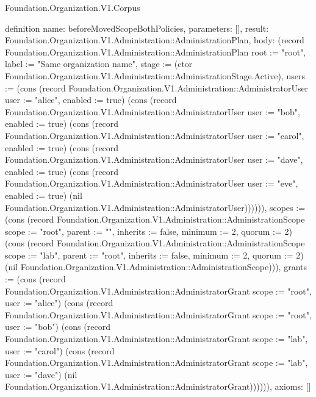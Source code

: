 \begin{lexlean}{Foundation.Organization.V1.Corpus}
\begin{semanticmodule}
definition{
  name: beforeMovedScopeBothPolicies,
  parameters: [],
  result: Foundation.Organization.V1.Administration::AdministrationPlan,
  body: (record Foundation.Organization.V1.Administration::AdministrationPlan {root := "root", label := "Same organization name", stage := (ctor Foundation.Organization.V1.Administration::AdministrationStage.Active), users := (cons (record Foundation.Organization.V1.Administration::AdministratorUser {user := "alice", enabled := true}) (cons (record Foundation.Organization.V1.Administration::AdministratorUser {user := "bob", enabled := true}) (cons (record Foundation.Organization.V1.Administration::AdministratorUser {user := "carol", enabled := true}) (cons (record Foundation.Organization.V1.Administration::AdministratorUser {user := "dave", enabled := true}) (cons (record Foundation.Organization.V1.Administration::AdministratorUser {user := "eve", enabled := true}) (nil Foundation.Organization.V1.Administration::AdministratorUser)))))), scopes := (cons (record Foundation.Organization.V1.Administration::AdministrationScope {scope := "root", parent := "", inherits := false, minimum := 2, quorum := 2}) (cons (record Foundation.Organization.V1.Administration::AdministrationScope {scope := "lab", parent := "root", inherits := false, minimum := 2, quorum := 2}) (nil Foundation.Organization.V1.Administration::AdministrationScope))), grants := (cons (record Foundation.Organization.V1.Administration::AdministratorGrant {scope := "root", user := "alice"}) (cons (record Foundation.Organization.V1.Administration::AdministratorGrant {scope := "root", user := "bob"}) (cons (record Foundation.Organization.V1.Administration::AdministratorGrant {scope := "lab", user := "carol"}) (cons (record Foundation.Organization.V1.Administration::AdministratorGrant {scope := "lab", user := "dave"}) (nil Foundation.Organization.V1.Administration::AdministratorGrant)))))}),
  axioms: []
}


\end{semanticmodule}
\end{lexlean}
